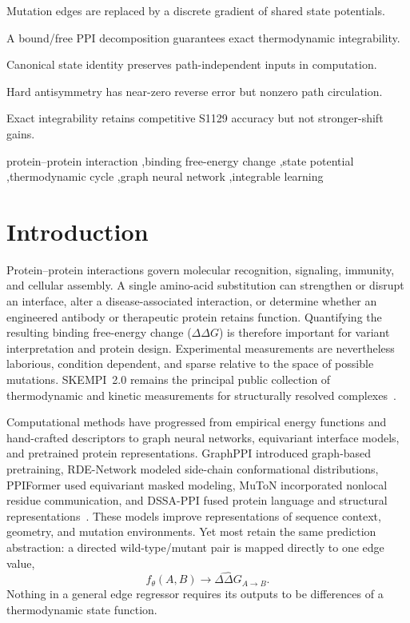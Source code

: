 \documentclass[preprint,12pt]{elsarticle}
\newcommand{\ddg}{\Delta\Delta G}
\begin{document}
\begin{frontmatter}
\begin{highlights}
\item Mutation edges are replaced by a discrete gradient of shared state potentials.
\item A bound/free PPI decomposition guarantees exact thermodynamic integrability.
\item Canonical state identity preserves path-independent inputs in computation.
\item Hard antisymmetry has near-zero reverse error but nonzero path circulation.
\item Exact integrability retains competitive S1129 accuracy but not stronger-shift gains.
\end{highlights}

\begin{keyword}
protein--protein interaction \sep binding free-energy change \sep state potential \sep thermodynamic cycle \sep graph neural network \sep integrable learning
\end{keyword}
\end{frontmatter}

\linenumbers

\section{Introduction}
\label{sec:introduction}

Protein--protein interactions govern molecular recognition, signaling, immunity, and cellular assembly. A single amino-acid substitution can strengthen or disrupt an interface, alter a disease-associated interaction, or determine whether an engineered antibody or therapeutic protein retains function. Quantifying the resulting binding free-energy change ($\ddg$) is therefore important for variant interpretation and protein design. Experimental measurements are nevertheless laborious, condition dependent, and sparse relative to the space of possible mutations. SKEMPI~2.0 remains the principal public collection of thermodynamic and kinetic measurements for structurally resolved complexes~\cite{skempi2}.

Computational methods have progressed from empirical energy functions and hand-crafted descriptors to graph neural networks, equivariant interface models, and pretrained protein representations. GraphPPI introduced graph-based pretraining, RDE-Network modeled side-chain conformational distributions, PPIFormer used equivariant masked modeling, MuToN incorporated nonlocal residue communication, and DSSA-PPI fused protein language and structural representations~\cite{graphppi,rdenetwork,ppiformer,muton,dssappi}. These models improve representations of sequence context, geometry, and mutation environments. Yet most retain the same prediction abstraction: a directed wild-type/mutant pair is mapped directly to one edge value,
\begin{equation}
  f_\theta(A,B)\longrightarrow \widehat{\ddg}_{A\rightarrow B}.
  \label{eq:edge_regression}
\end{equation}
Nothing in a general edge regressor requires its outputs to be differences of a thermodynamic state function.
\end{document}

